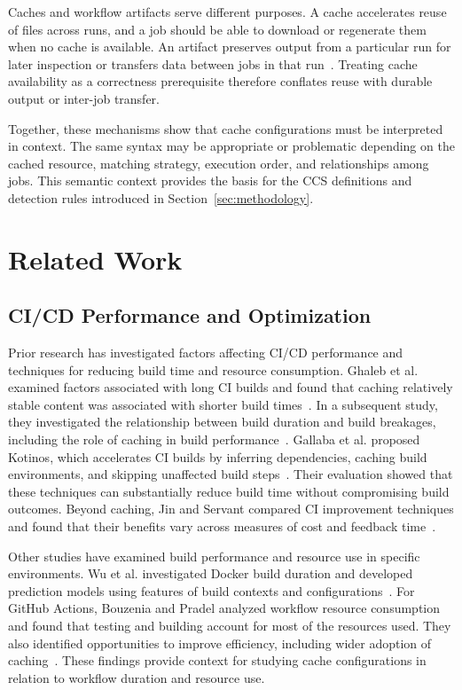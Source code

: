 \documentclass[smallextended]{svjour3}
\begin{document}
Caches and workflow artifacts serve different purposes. A cache accelerates reuse of files across runs, and a job should be able to download or regenerate them when no cache is available. An artifact preserves output from a particular run for later inspection or transfers data between jobs in that run~\citep{gha_cache_concepts,gha_artifact_docs}. Treating cache availability as a correctness prerequisite therefore conflates reuse with durable output or inter-job transfer.

Together, these mechanisms show that cache configurations must be interpreted in context. The same syntax may be appropriate or problematic depending on the cached resource, matching strategy, execution order, and relationships among jobs. This semantic context provides the basis for the CCS definitions and detection rules introduced in Section~\ref{sec:methodology}.


\section{Related Work}
\label{sec:related_work}

\subsection{CI/CD Performance and Optimization}

Prior research has investigated factors affecting CI/CD performance and techniques for reducing build time and resource consumption. Ghaleb et al. examined factors associated with long CI builds and found that caching relatively stable content was associated with shorter build times~\citep{ghaleb2019empirical}. In a subsequent study, they investigated the relationship between build duration and build breakages, including the role of caching in build performance~\citep{ghaleb2022studying}. Gallaba et al. proposed Kotinos, which accelerates CI builds by inferring dependencies, caching build environments, and skipping unaffected build steps~\citep{gallaba2022caching}. Their evaluation showed that these techniques can substantially reduce build time without compromising build outcomes. Beyond caching, Jin and Servant compared CI improvement techniques and found that their benefits vary across measures of cost and feedback time~\citep{jin2021ci}.

Other studies have examined build performance and resource use in specific environments. Wu et al. investigated Docker build duration and developed prediction models using features of build contexts and configurations~\citep{wu2022dockerbuildduration}. For GitHub Actions, Bouzenia and Pradel analyzed workflow resource consumption and found that testing and building account for most of the resources used. They also identified opportunities to improve efficiency, including wider adoption of caching~\citep{bouzenia2024resource}. These findings provide context for studying cache configurations in relation to workflow duration and resource use.
\end{document}

